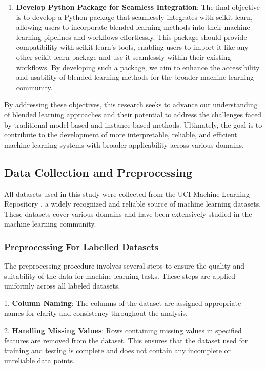 \documentclass[a4paper, 12pt]{report}
\begin{document}
\begin{enumerate}
    \item \textbf{Develop Python Package for Seamless Integration}: 
    The final objective is to develop a Python package that seamlessly integrates with scikit-learn, allowing users to incorporate blended learning methods into their machine learning pipelines and workflows effortlessly. 
    This package should provide compatibility with scikit-learn's tools, enabling users to import it like any other scikit-learn package and use it seamlessly within their existing workflows. 
    By developing such a package, we aim to enhance the accessibility and usability of blended learning methods for the broader machine learning community.
\end{enumerate}

By addressing these objectives, this research seeks to advance our understanding of blended learning approaches and their potential to address the challenges faced by 
traditional model-based and instance-based methods. Ultimately, the goal is to contribute to the development of more interpretable, reliable, and efficient machine learning 
systems with broader applicability across various domains.

\subsection{Data Collection and Preprocessing}
All datasets used in this study were collected from the UCI Machine Learning Repository \cite{uciRepository}, 
a widely recognized and reliable source of machine learning datasets. 
These datasets cover various domains and have been extensively studied in the machine learning community.

\subsubsection{Preprocessing For Labelled Datasets}
The preprocessing procedure involves several steps to ensure the quality and suitability of the data for machine learning tasks. These steps are applied uniformly across all labeled datasets.

1. \textbf{Column Naming}: The columns of the dataset are assigned appropriate names for clarity and consistency throughout the analysis.

2. \textbf{Handling Missing Values}: Rows containing missing values in specified features are removed from the dataset. 
This ensures that the dataset used for training and testing is complete and does not contain any incomplete or unreliable data points.
\end{document}
